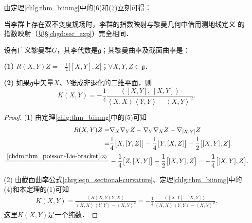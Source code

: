 由定理\ref{chlg:thm_biinmg}中的(6)和(7)立刻可得：
\begin{corollary}\label{chlg:thm_expiso}
    当李群上存在双不变度规场时，李群的指数映射与黎曼几何中借用测地线定义
    的指数映射（见\S\ref{chgd:sec_exp}）完全相同．
\end{corollary}

\begin{theorem}\label{chlg:thm_riemann-section-curvature}
    设有广义黎曼群$G$，其李代数是$\mathfrak{g}$；其黎曼曲率及截面曲率是：
    
    {\bfseries (1)} $R(X,Y)Z=-\frac{1}{4}\bigl[[X,Y],Z\bigr]$；$ \forall X,Y,Z\in \mathfrak{g}$．
    
    {\bfseries (2)} 如果$\mathfrak{g}$中矢量$X$、$Y$张成非退化的二维平面，则
    \begin{equation}
        K(X,Y)=-\frac{1}{4} \frac{\left<[X,Y],\  [X,Y]\right>}
        {\left<X,X\right>\left<Y,Y\right>-\left<X,Y\right>^2} .
    \end{equation}
\end{theorem}
\begin{proof}
    (1) 由定理\ref{chlg:thm_biinmg}中的(5)可知
    \begin{align*}
        R(X,Y)Z =& \nabla_X \nabla_Y Z - \nabla_Y \nabla_X Z - \nabla_{[X,Y]} Z \\
        =&  \frac{1}{4} \bigl[X, [Y,Z]\bigr] - \frac{1}{4} \bigl[Y, [X,Z]\bigr]
        -\frac{1}{2} \bigl[[X,Y],Z\bigr] \\
        \xlongequal{\ref{chdm:thm_poisson-Lie-bracket}(3)}&
        -\frac{1}{4} \bigl[Z, [X,Y]\bigr] -\frac{1}{2} \bigl[[X,Y],Z\bigr] 
        =  -\frac{1}{4} \bigl[[X,Y],Z\bigr] .
    \end{align*}
    
    (2) 由截面曲率公式\eqref{chrg:eqn_sectional-curvature}、定理\ref{chlg:thm_biinmg}中的(4)和本定理的(1)可知
    \begin{align*}
        K(X,Y) %
        = \frac{\left<R(X,Y)Y,X\right> } {\left<X,X\right>\left<Y,Y\right>-\left<X,Y\right>^2} 
        = -\frac{1}{4} \frac{\left<[X,Y],\  [X,Y]\right>}
        {\left<X,X\right>\left<Y,Y\right>-\left<X,Y\right>^2} .
    \end{align*}
    这里$K (X, Y)$是一个纯数．
\end{proof}











